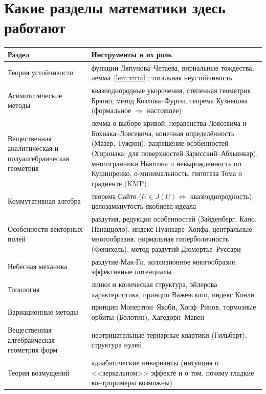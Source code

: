 \documentclass[11pt,a4paper]{article}
\theoremstyle{definition}
\begin{document}
\section{Какие разделы математики здесь работают}
\begin{center}
\small
\begin{tabularx}{\textwidth}{>{\raggedright\arraybackslash}p{4.3cm}X}
\toprule
Раздел & Инструменты и их роль\\
\midrule
Теория устойчивости & функции Ляпунова--Четаева, вириальные тождества, лемма~\ref{lem:virial}; тотальная неустойчивость\\
Асимптотические методы & квазиоднородные укорочения, степенная геометрия Брюно, метод Козлова--Фурты, теорема Кузнецова (формальное $\Rightarrow$ настоящее)\\
Вещественная аналитическая и полуалгебраическая геометрия & лемма о выборе кривой, неравенства Лоясевича и Бохнака--Лоясевича, конечная определённость (Мазер, Тужрон), разрешение особенностей (Хиронака; для поверхностей Зарисский--Абхьянкар), многогранники Ньютона и невырожденность по Кушниренко, о-минимальность, гипотеза Тома о градиенте (KMP)\\
Коммутативная алгебра & теорема Сайто ($U\in J(U)\iff$ квазиоднородность), целозамкнутость якобиева идеала\\
Особенности векторных полей & раздутия, редукция особенностей (Зайденберг, Кано, Панаццоло), индекс Пуанкаре--Хопфа, центральные многообразия, нормальная гиперболичность (Фенихель), метод раздутий Дюмортье--Руссари\\
Небесная механика & раздутие Мак-Ги, коллизионное многообразие, эффективные потенциалы\\
Топология & линки и коническая структура, эйлерова характеристика, принцип Важевского, индекс Конли\\
Вариационные методы & принцип Мопертюи--Якоби, Хопф--Ринов, тормозные орбиты (Болотин), Хагедорн--Мавен\\
Вещественная алгебраическая геометрия форм & неотрицательные тернарные квартики (Гильберт), структура нулей\\
Теория возмущений & адиабатические инварианты (интуиция о <<зеркальном>> эффекте и о том, почему гладкие контрпримеры возможны)\\
\bottomrule
\end{tabularx}
\end{center}

\end{document}
